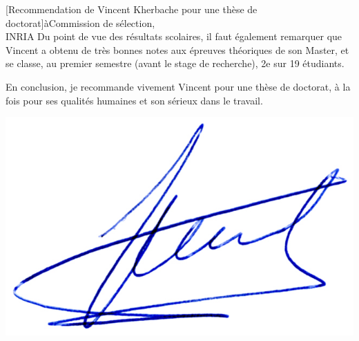 \documentclass[a4paper,10pt]{article}
\begin{document}
\begin{letter}[Recommendation de Vincent Kherbache pour une thèse de doctorat]{à}{Commission de sélection,\\INRIA}
Du point de vue des résultats scolaires, il faut également remarquer que Vincent 
a obtenu de très bonnes notes aux épreuves théoriques de son Master, et se classe,
au premier semestre (avant le stage de recherche), 2e sur 19 étudiants.

En conclusion, je recommande vivement Vincent pour une thèse de doctorat, à la 
fois pour ses qualités humaines et son sérieux dans le travail. 


\end{letter}
\begin{flushright}
\includegraphics[width=.20\textwidth]{signgenaud.jpg}
\end{flushright}
%
%
\end{document}
